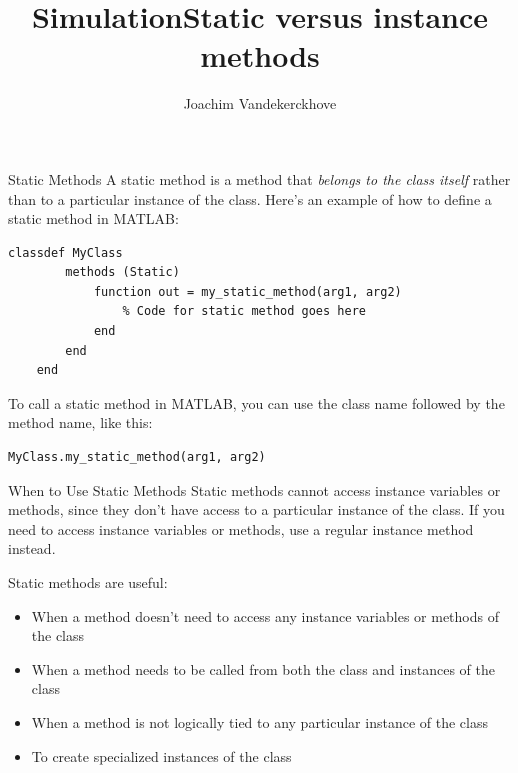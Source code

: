 \documentclass{beamer}
\title{Simulation}
\author{Joachim Vandekerckhove}
\date{}
\begin{document}
\title{Static versus instance methods}
\begin{frame}
  \maketitle
\end{frame}

\begin{frame}[fragile]{Static Methods}
    A static method is a method that \emph{belongs to the class itself} rather than to a particular instance of the class. Here's an example of how to define a static method in MATLAB:
    \begin{lstlisting}[style=Matlab]
    classdef MyClass
        methods (Static)
            function out = my_static_method(arg1, arg2)
                % Code for static method goes here
            end
        end
    end
    \end{lstlisting}
    To call a static method in MATLAB, you can use the class name followed by the method name, like this:
    \begin{lstlisting}[style=Matlab]
    MyClass.my_static_method(arg1, arg2)
    \end{lstlisting}
\end{frame}

\begin{frame}[fragile]{When to Use Static Methods}
    Static methods cannot access instance variables or methods, since they don't have access to a particular instance of the class. If you need to access instance variables or methods, use a regular instance method instead.
    
    Static methods are useful:
    \begin{itemize}
        \item When a method doesn't need to access any instance variables or methods of the class
        \item When a method needs to be called from both the class and instances of the class
        \item When a method is not logically tied to any particular instance of the class
        \item To create specialized instances of the class
    \end{itemize}
\end{frame}
\end{document}
